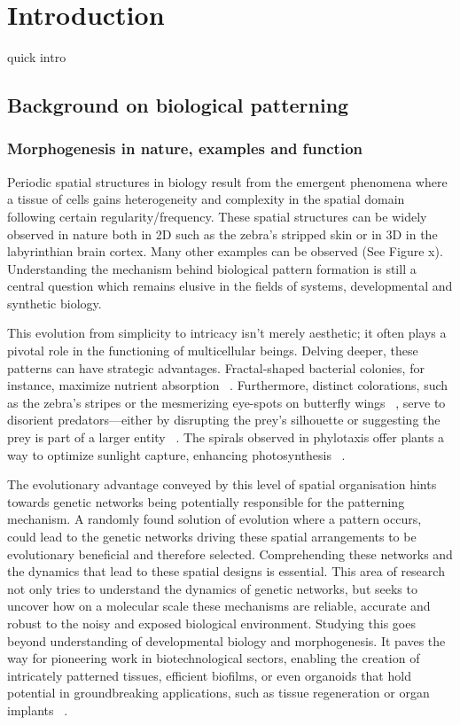 
\chapter{Introduction}

quick intro
\section{Background on biological patterning}
\subsection{Morphogenesis in nature, examples and function}
Periodic spatial structures in biology result from the emergent phenomena where a tissue of cells gains heterogeneity and complexity in the spatial domain following certain regularity/frequency.
These spatial structures can be widely observed in nature both in 2D such as the zebra's stripped skin or in 3D in the labyrinthian brain cortex.
Many other examples can be observed (See Figure x).
Understanding the mechanism behind biological pattern formation is still a central question which remains elusive in the fields of systems, developmental and synthetic biology.

This evolution from simplicity to intricacy isn't merely aesthetic; it often plays a pivotal role in the functioning of multicellular beings.
Delving deeper, these patterns can have strategic advantages.
Fractal-shaped bacterial colonies, for instance, maximize nutrient absorption ~\parencite{Matsushita1990}.
Furthermore, distinct colorations, such as the zebra's stripes or the mesmerizing eye-spots on butterfly wings ~\parencite{Blest}, serve to disorient predators—either by disrupting the prey's silhouette or suggesting the prey is part of a larger entity ~\parencite{Stevens2006}.
The spirals observed in phylotaxis offer plants a way to optimize sunlight capture, enhancing photosynthesis ~\parencite{Strauss2020}.

The evolutionary advantage conveyed by this level of spatial organisation  hints towards genetic networks being potentially responsible for the patterning mechanism.
A randomly found solution of evolution where a pattern occurs, could lead to the genetic networks driving these spatial arrangements to be evolutionary beneficial and therefore selected.
Comprehending these networks and the dynamics that lead to these spatial designs is essential.
This area of research not only tries to understand the dynamics of genetic networks, but seeks to uncover how on a molecular scale these mechanisms are reliable, accurate and robust to the noisy and exposed biological environment.
Studying this goes beyond understanding of developmental biology and morphogenesis.
It paves the way for pioneering work in biotechnological sectors, enabling the creation of intricately patterned tissues, efficient biofilms, or even organoids that hold potential in groundbreaking applications, such as tissue regeneration or organ implants ~\parencite{Scholes2017,Tan2018}.



